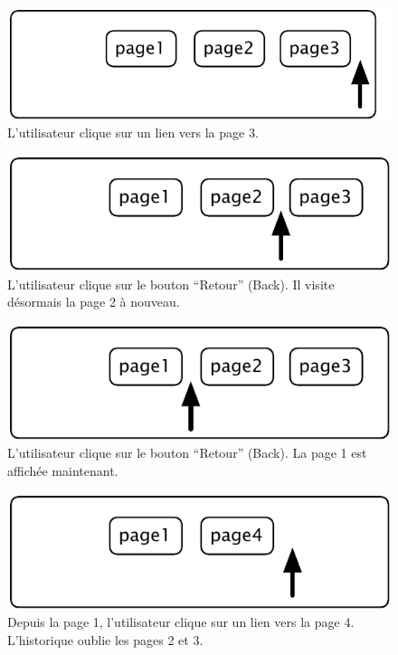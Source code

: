 \documentclass[a4paper,10pt,twoside]{book}
\begin{document}
\begin{figure}[!ht]
\centerline{\includegraphics[scale=0.5]{page3Stef}}
\caption{L'utilisateur clique sur un lien vers la page 3.}
\label{fig:page3}
\vspace{.2in}
\end{figure}

\begin{figure}[!ht]
\centerline{\includegraphics[scale=0.5]{page2_Stef}}
\caption{L'utilisateur clique sur le bouton ``Retour'' (Back). Il visite d\'esormais la page 2 \`a nouveau.}
\label{fig:page2_}
\vspace{.2in}
\end{figure}

\begin{figure}[!ht]
\centerline{\includegraphics[scale=0.5]{page1_Stef}}
\caption{L'utilisateur clique sur le bouton ``Retour'' (Back). La page 1 est affich\'ee maintenant.}
\label{fig:page1_}
\vspace{.2in}
\end{figure}

\begin{figure}[!ht]
\centerline{\includegraphics[scale=0.5]{page4Stef}}
\caption{Depuis la page 1, l'utilisateur clique sur un lien vers la page 4. L'historique oublie les pages 2 et 3.}
\label{fig:page4}
\vspace{.2in}
\end{figure}
\end{document}
